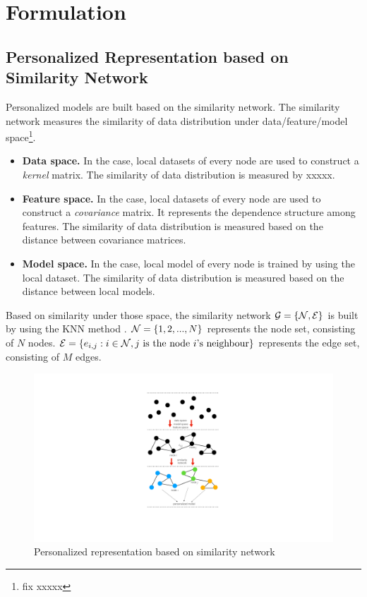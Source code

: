 \documentclass[journal]{IEEEtran}
\begin{document}
\section{Formulation}

\subsection{Personalized Representation based on Similarity Network}

{\color {red} Personalized models are built based on the similarity network. The similarity network measures the similarity of data distribution under data/feature/model space\footnote{fix xxxxx}.}  
\begin{itemize}
\item \textbf{Data space.} In the case, local datasets of every node are used to construct a \textit{kernel} matrix. The similarity of data distribution is measured by xxxxx.
\item \textbf{Feature space.} In the case, local datasets of every node are used to construct a \textit{covariance} matrix. It represents the dependence structure among features. The similarity of data distribution is measured based on the distance between covariance matrices.
\item \textbf{Model space.} In the case, local model of every node is trained by using the local dataset. The similarity of data distribution is measured based on the distance between local models.
\end{itemize}

Based on similarity under those space, the similarity network ${\mathcal{G}} = \{{\mathcal{N}}, {\mathcal{E}}\}$ is built by using the KNN method \cite{dd}. ${\mathcal{N}}=\{1,2, ..., N\}$ represents the node set, consisting of $N$ nodes. ${\mathcal{E}}=\{e_{i,j} : i\in{\mathcal{N}}, j {~} \text{is the node $i$'s neighbour}\}$ represents the edge set, consisting of $M$ edges. 

\begin{figure}[!t]
\setlength{\abovecaptionskip}{0pt}
\setlength{\belowcaptionskip}{0pt}
\centering 
\includegraphics[width=0.97\columnwidth]{figs/figs_networkG}
\caption{Personalized representation based on similarity network}
\label{figure_xxx}
\end{figure}
\end{document}
